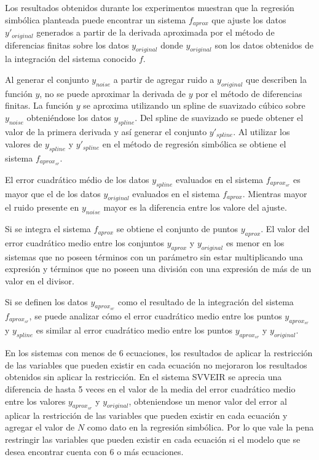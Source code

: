 Los resultados obtenidos durante los experimentos muestran que la regresión simbólica planteada puede encontrar un sistema $f_{aprox}$ que ajuste los datos $y'_{original}$ generados a partir de la derivada aproximada por el método de diferencias finitas sobre los datos $y_{original}$ donde $y_{original}$ son los datos obtenidos de la integración del sistema conocido $f$.

Al generar el conjunto $y_{noise}$ a partir de agregar ruido a $y_{original}$ que describen la función $y$, no se puede aproximar la derivada de $y$ por el método de diferencias finitas. La función $y$ se aproxima utilizando un spline de suavizado cúbico sobre $y_{noise}$ obteniéndose los datos $y_{spline}$. Del spline de suavizado se puede obtener el valor de la primera derivada y así generar el conjunto $y'_{spline}$. Al utilizar los valores de $y_{spline}$ y $y'_{spline}$ en el método de regresión simbólica se obtiene el sistema $f_{aprox_{sr}}$.

El error cuadrático médio de los datos $y_{spline}$ evaluados en el sistema $f_{aprox_{sr}}$ es mayor que el de los datos $y_{original}$ evaluados en el sistema $f_{aprox}$. Mientras mayor el ruido presente en $y_{noise}$ mayor es la diferencia entre los valore del ajuste.

Si se integra el sistema $f_{aprox}$ se obtiene el conjunto de puntos $y_{aprox}$. El valor del error cuadrático medio entre los conjuntos $y_{aprox}$ y $y_{original}$ es menor en los sistemas que no poseen términos con un parámetro sin estar multiplicando una expresión y términos que no poseen una división con una expresión de más de un valor en el divisor.

Si se definen los datos $y_{aprox_{sr}}$ como el resultado de la integración del sistema $f_{aprox_{sr}}$, se puede analizar cómo el error cuadrático medio entre los puntos $y_{aprox_{sr}}$ y $y_{spline}$ es similar al error cuadrático medio entre los puntos $y_{aprox_{sr}}$ y $y_{original}$.

En los sistemas con menos de 6 ecuaciones, los resultados de aplicar la restricción de las variables que pueden existir en cada ecuación no mejoraron los resultados obtenidos sin aplicar la restricción. En el sistema SVVEIR se aprecia una diferencia de hasta 5 veces en el valor de la media del error cuadrático medio entre los valores $y_{aprox_{sr}}$ y $y_{original}$, obteniendose un menor valor del error al aplicar la restricción de las variables que pueden existir en cada ecuación y agregar el valor de $N$ como dato en la regresión simbólica. Por lo que vale la pena restringir las variables que pueden existir en cada ecuación si el modelo que se desea encontrar cuenta con 6 o más ecuaciones.

